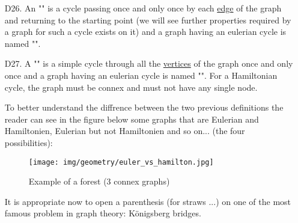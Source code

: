 {\begin{enumerate}
	Properties:
	\begin{enumerate}
		\item[P1.] If in a graph $G$ is any vertex is of degree greater than or equal to $2$, then $G$ has at least one cycle (trivial).
		\begin{tcolorbox}[title=Remark,colframe=black,arc=10pt]
		This simple property implies that a graph without cycle without graph has at least one vertex of degree $0$ or $1$.
	\end{tcolorbox}	
		
		\item[P2.] An acyclic graph $G$ with $n$ vertices has at most $n-1$ edges as we already know.
	\end{enumerate}

	\item[D26.] An "" is a cycle passing once and only once by each \underline{edge} of the graph and returning to the starting point (we will see further properties required by a graph for such a cycle exists on it) and a graph having an eulerian cycle is named "".
	
	\item[D27.] A "" is a simple cycle through all the \underline{vertices} of the graph once and only once and a graph having an eulerian cycle is named "". For a Hamiltonian cycle, the graph must be connex and must not have any single node.
	
	To better understand the diffrence between the two previous definitions the reader can see in the figure below some graphs that are Eulerian and Hamiltonien, Eulerian but not Hamiltonien and so on... (the four possibilities):
	\begin{figure}[H]
		\centering
		\texttt{[image: img/geometry/euler\_vs\_hamilton.jpg]}
		\caption{Example of a forest (3 connex graphs)}
	\end{figure}
	It is appropriate now to open a parenthesis (for straws ...) on one of the most famous problem in graph theory: Königsberg bridges.
	

\end{enumerate}}
